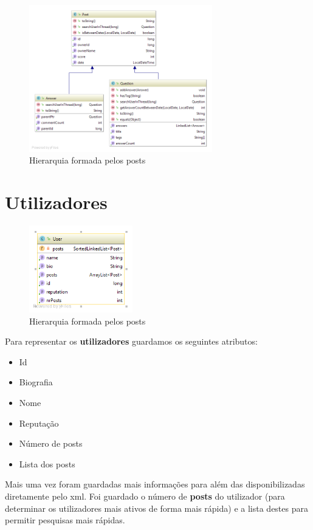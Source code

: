 \documentclass[10pt,a4paper]{report}
\begin{document}
    \begin{figure}[h]
        \centering
        \includegraphics[width=0.71\textwidth]{./images/PostHierarchy.png}
        \caption{Hierarquia formada pelos posts}
    \end{figure}

    \section{Utilizadores}

    \begin{figure}
        \includegraphics[width=0.4\textwidth]{./images/User.png}
        \caption{Hierarquia formada pelos posts}
    \end{figure}

    Para representar os \textbf{utilizadores} guardamos os seguintes atributos:
    \begin{multicols}{2}
    \begin{itemize}
        \item Id
        \item Biografia
        \item Nome
        \item Reputação
        \item Número de posts
        \item Lista dos posts
    \end{itemize}
    \end{multicols}
    Mais uma vez foram guardadas mais informações para além das disponibilizadas
    diretamente pelo xml. Foi guardado o número de \textbf{posts} do utilizador
    (para determinar os utilizadores mais ativos de forma mais rápida) e a lista
    destes para permitir pesquisas mais rápidas.
\end{document}
